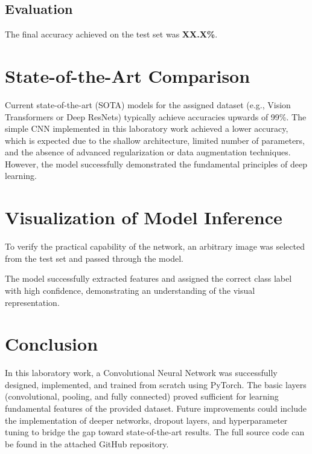 \documentclass[12pt, a4paper]{article}
\begin{document}
\subsection{Evaluation}
The final accuracy achieved on the test set was \textbf{XX.X\%}.

\section{State-of-the-Art Comparison}
Current state-of-the-art (SOTA) models for the assigned dataset (e.g., Vision Transformers or Deep ResNets) typically achieve accuracies upwards of 99\%. 
The simple CNN implemented in this laboratory work achieved a lower accuracy, which is expected due to the shallow architecture, limited number of parameters, and the absence of advanced regularization or data augmentation techniques. However, the model successfully demonstrated the fundamental principles of deep learning.

\section{Visualization of Model Inference}
To verify the practical capability of the network, an arbitrary image was selected from the test set and passed through the model. 


The model successfully extracted features and assigned the correct class label with high confidence, demonstrating an understanding of the visual representation.

\section{Conclusion}
In this laboratory work, a Convolutional Neural Network was successfully designed, implemented, and trained from scratch using PyTorch. The basic layers (convolutional, pooling, and fully connected) proved sufficient for learning fundamental features of the provided dataset. Future improvements could include the implementation of deeper networks, dropout layers, and hyperparameter tuning to bridge the gap toward state-of-the-art results. The full source code can be found in the attached GitHub repository.
\end{document}
